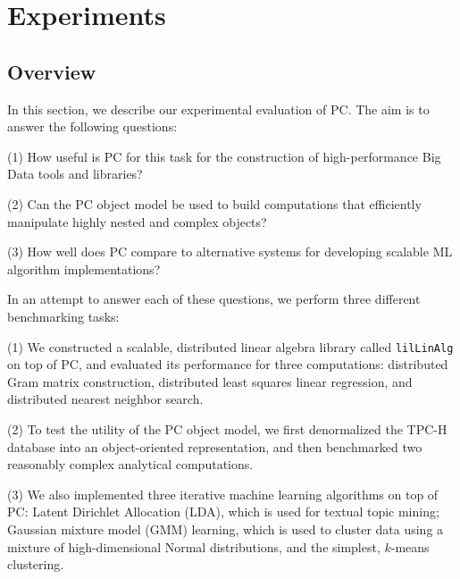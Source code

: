 
\section{Experiments}
\label{sec:exp}

\subsection{Overview}

In this section, we describe our experimental evaluation of PC.
The aim is to answer
the following questions:

\vspace{5pt}
\noindent
(1) How useful is PC for this task for the construction of high-performance Big Data tools and libraries?

\vspace{2pt}
\noindent
(2) Can the PC object model be used to build 
computations that efficiently manipulate highly nested and complex objects?

\vspace{2pt}
\noindent
(3) How well does PC compare to alternative systems for developing scalable ML algorithm implementations?

\vspace{5pt}

\noindent In an attempt to answer each of these questions, we perform three different benchmarking tasks:

\vspace{5pt}
\noindent
(1) We constructed a scalable, distributed
linear algebra library
called \texttt{lilLinAlg} on top of PC, and evaluated its performance for three
computations: distributed Gram matrix construction, 
distributed least squares linear regression, and distributed nearest neighbor search.

\vspace{2pt}
\noindent
(2) To test the utility of the PC object model, we first denormalized the TPC-H database \cite{council2008tpc} into an object-oriented 
representation, and then benchmarked two reasonably complex 
analytical computations.

\vspace{2pt}
\noindent
(3) We also implemented three
  iterative machine learning algorithms on top of PC: Latent Dirichlet Allocation (LDA), which is used for
  textual topic mining;
  Gaussian mixture model (GMM) learning, which is used to cluster data using a mixture of high-dimensional Normal
  distributions, and the simplest, $k$-means clustering.

